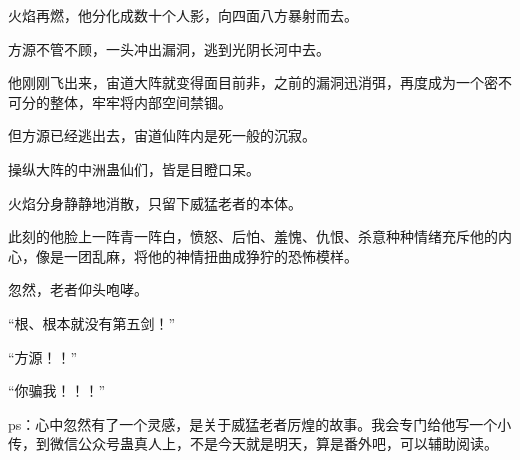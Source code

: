 \begin{this_body}
火焰再燃，他分化成数十个人影，向四面八方暴射而去。

方源不管不顾，一头冲出漏洞，逃到光阴长河中去。

他刚刚飞出来，宙道大阵就变得面目前非，之前的漏洞迅消弭，再度成为一个密不可分的整体，牢牢将内部空间禁锢。

但方源已经逃出去，宙道仙阵内是死一般的沉寂。

操纵大阵的中洲蛊仙们，皆是目瞪口呆。

火焰分身静静地消散，只留下威猛老者的本体。

此刻的他脸上一阵青一阵白，愤怒、后怕、羞愧、仇恨、杀意种种情绪充斥他的内心，像是一团乱麻，将他的神情扭曲成狰狞的恐怖模样。

忽然，老者仰头咆哮。

“根、根本就没有第五剑！”

“方源！！”

“你骗我！！！”

ps：心中忽然有了一个灵感，是关于威猛老者厉煌的故事。我会专门给他写一个小传，到微信公众号蛊真人上，不是今天就是明天，算是番外吧，可以辅助阅读。

\end{this_body}

